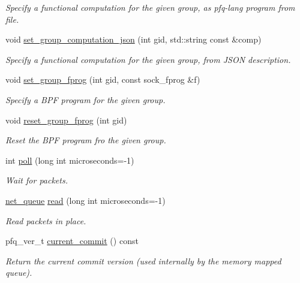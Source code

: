\begin{DoxyCompactItemize}
\begin{DoxyCompactList}\small\item\em Specify a functional computation for the given group, as pfq-\/lang program from file. \end{DoxyCompactList}\item 
void \hyperlink{classpfq_1_1socket_ac60650eec56374ac4be3c69b43255b85}{set\+\_\+group\+\_\+computation\+\_\+json} (int gid, std\+::string const \&comp)
\begin{DoxyCompactList}\small\item\em Specify a functional computation for the given group, from J\+S\+ON description. \end{DoxyCompactList}\item 
void \hyperlink{classpfq_1_1socket_ad618894910a12a08eaed3d8668db25af}{set\+\_\+group\+\_\+fprog} (int gid, const sock\+\_\+fprog \&f)
\begin{DoxyCompactList}\small\item\em Specify a B\+PF program for the given group. \end{DoxyCompactList}\item 
void \hyperlink{classpfq_1_1socket_a2327e71a6f94e54efb0da5ec36b1c620}{reset\+\_\+group\+\_\+fprog} (int gid)
\begin{DoxyCompactList}\small\item\em Reset the B\+PF program fro the given group. \end{DoxyCompactList}\item 
int \hyperlink{classpfq_1_1socket_ad8ce551ea07f39317bb383ab88d66344}{poll} (long int microseconds=-\/1)
\begin{DoxyCompactList}\small\item\em Wait for packets. \end{DoxyCompactList}\item 
\hyperlink{classpfq_1_1net__queue}{net\+\_\+queue} \hyperlink{classpfq_1_1socket_a6004249d3abfe8a2329b44ba797d1909}{read} (long int microseconds=-\/1)
\begin{DoxyCompactList}\small\item\em Read packets in place. \end{DoxyCompactList}\item 
pfq\+\_\+ver\+\_\+t \hyperlink{classpfq_1_1socket_aad339d83d02f01da6ed3596178d21350}{current\+\_\+commit} () const 
\begin{DoxyCompactList}\small\item\em Return the current commit version (used internally by the memory mapped queue). \end{DoxyCompactList}\item 

\end{DoxyCompactItemize}
